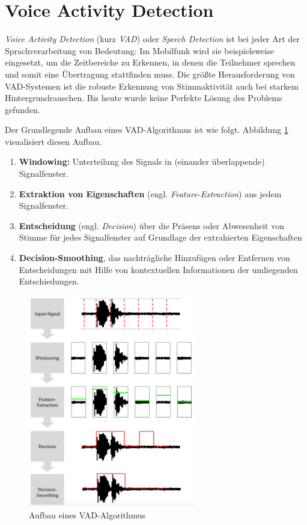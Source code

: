 \section{Voice Activity Detection}
\label{sec:vad_new}

\emph{Voice Activity Detection} (kurz \emph{VAD}) oder \emph{Speech Detection} ist bei jeder Art der Sprachverarbeitung von Bedeutung: Im Mobilfunk wird sie beispielsweise eingesetzt, um die Zeitbereiche zu Erkennen, in denen die Teilnehmer sprechen und somit eine Übertragung stattfinden muss. Die größte Herausforderung von VAD-Systemen ist die robuste Erkennung von Stimmaktivität auch bei starkem Hintergrundrauschen. Bis heute wurde keine \glqq Perfekte Lösung\grqq{} des Problems gefunden. \cite[S. 1]{vad_granada} \cite[S. 1]{vad_kola} \cite[S. 1]{vad_Lisboa}

Der Grundlegende Aufbau eines VAD-Algorithmus ist wie folgt. Abbildung \ref{img:vad_pipeline} visualisiert diesen Aufbau.
\begin{enumerate}
	\item \textbf{Windowing: } Unterteilung des Signals in (einander überlappende) Signalfenster.
	\item \textbf{Extraktion von Eigenschaften} (engl. \emph{Feature-Extraction}) aus jedem Signalfenster.
	\item \textbf{Entscheidung} (engl. \emph{Decision}) über die Präsens oder Abwesenheit von Stimme für jedes Signalfenster auf Grundlage der extrahierten Eigenschaften
	\item \textbf{Decision-Smoothing}, das nachträgliche Hinzufügen oder Entfernen von Entscheidungen mit Hilfe von kontextuellen Informationen der umliegenden Entschiedungen.\cite[S. 8 - 9]{vad_granada} \cite[S. 1 - 2]{vad_kola}
\end{enumerate}

\begin{figure}[h]
	\centering
	\includegraphics[width=0.65\textwidth]{bilder/vad_pipeline03.png}
	\caption{Aufbau eines VAD-Algorithmus}
	\label{img:vad_pipeline}
\end{figure}


